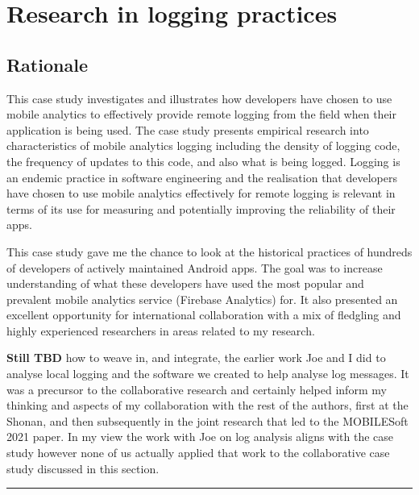 \section{Research in logging practices}
\label{section-research-in-logging-practices}


\subsection*{Rationale}

This case study investigates and illustrates how developers have chosen to use mobile analytics to effectively provide remote logging from the field when their application is being used. The case study presents empirical research into characteristics of mobile analytics logging including the density of logging code, the frequency of updates to this code, and also what is being logged. Logging is an endemic practice in software engineering and the realisation that developers have chosen to use mobile analytics effectively for remote logging is relevant in terms of its use for measuring and potentially improving the reliability of their apps.

This case study gave me the chance to look at the historical practices of hundreds of developers of actively maintained Android apps. The goal was to increase understanding of what these developers have used the most popular and prevalent mobile analytics service (Firebase Analytics) for. It also presented an excellent opportunity for international collaboration with a mix of fledgling and highly experienced researchers in areas related to my research.

\textbf{Still TBD} how to weave in, and integrate, the earlier work Joe and I did to analyse local logging and the software we created to help analyse log messages. It was a precursor to the collaborative research and certainly helped inform my thinking and aspects of my collaboration with the rest of the authors, first at the Shonan, and then subsequently in the joint research that led to the MOBILESoft 2021 paper. In my view the work with Joe on log analysis aligns with the case study however none of us actually applied that work to the collaborative case study discussed in this section.

\par\noindent\rule{\textwidth}{0.4pt}

